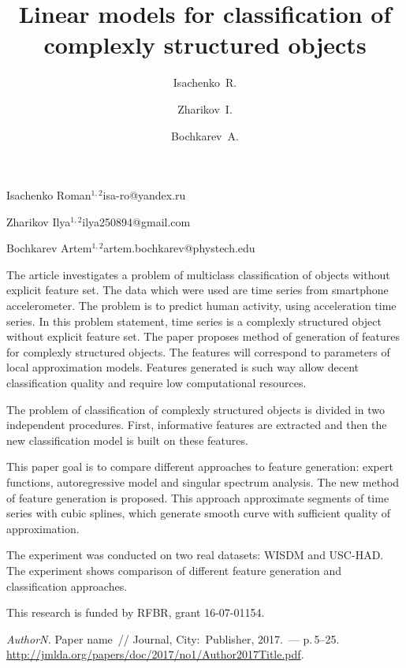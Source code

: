 \documentclass[twoside]{article}
\begin{document}
\English
\title{Linear models for classification of complexly structured objects}
\author{Isachenko~R.}{Isachenko Roman$^{1, 2}$}{isa-ro@yandex.ru}
\author{Zharikov~I.}{Zharikov Ilya$^{1, 2}$}{ilya250894@gmail.com}
\author{Bochkarev~A.}{Bochkarev Artem$^{1, 2}$\speaker}{artem.bochkarev@phystech.edu}
\maketitle

The article investigates a problem of multiclass classification of objects without explicit feature set.
The data which were used are time series from smartphone accelerometer.
The problem is to predict human activity, using acceleration time series.
In this problem statement, time series is a complexly structured object without explicit feature set.
The paper proposes method of generation of features for complexly structured objects.
The features will correspond to parameters of local approximation models.
Features generated is such way allow decent classification quality and require low computational resources.

The problem of classification of complexly structured objects is divided in two independent procedures.
First, informative features are extracted and then the new classification model is built on these features.

This paper goal is to compare different approaches to feature generation: expert functions, autoregressive model and singular spectrum analysis.
The new method of feature generation is proposed.
This approach approximate segments of time series with cubic splines, which generate smooth curve with sufficient quality of approximation.

The experiment was conducted on two real datasets: WISDM and USC-HAD.\\
The experiment shows comparison of different feature generation and classification approaches.

This research is funded by RFBR, grant 16-07-01154.

\begin{thebibliography}{1}
    \emph{Author\;N.}
    Paper name~//
    Journal,
    City:~Publisher, 2017.~--- p.\,5--25.
    \url{http://jmlda.org/papers/doc/2017/no1/Author2017Title.pdf}.
\end{thebibliography}
\end{document}
